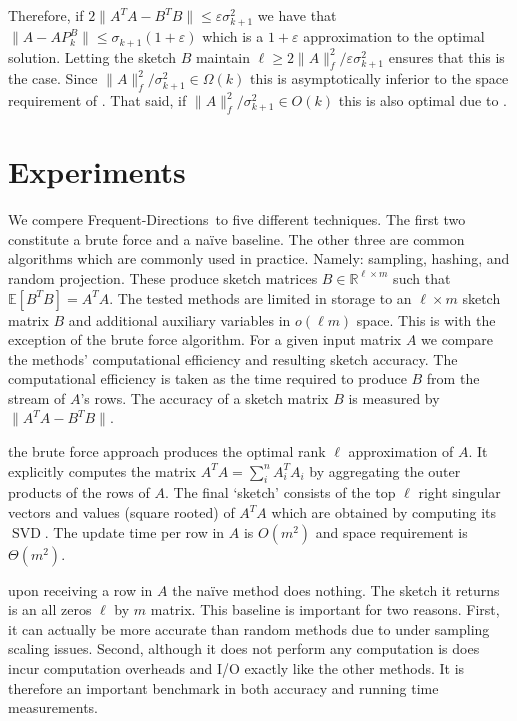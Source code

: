 \documentclass[]{article}
\newcommand{\SVD}{\operatorname{SVD}}
\newcommand{\R}{{\mathbb R}}
\newcommand{\E}{{\mathbb E}}
\newcommand{\eps}{\varepsilon}
\newcommand{\FD}{Frequent-Directions}
\begin{document}
Therefore, if  $2\|A^{T}A - B^{T}B\| \le \eps \sigma^{2}_{k+1}$ we have that $\|A - AP^{B}_{k}\| \le \sigma_{k+1}(1+\eps)$
which is a $1+\eps$ approximation to the optimal solution.
Letting the sketch $B$ maintain $\ell \ge 2\|A\|^{2}_{f}/\eps \sigma^{2}_{k+1}$ ensures that this is the case.
Since $\|A\|_{f}^{2} / \sigma_{k+1}^{2} \in \Omega(k)$ this is asymptotically inferior to the space requirement of \cite{BoutsidisDrineasMagdon2011}. That said, if $\|A\|_{f}^{2}/\sigma_{k+1}^{2} \in O(k)$ this is also optimal due to \cite{ClarksonWoodruff2009}.  


\section{Experiments}\label{experiments}

We compere \FD~to five different techniques. 
The first two constitute a brute force and a na\"ive baseline. 
The other three are common algorithms which are commonly used in practice.
Namely: sampling, hashing, and random projection. 
These produce sketch matrices $B \in \R^{\ell \times m}$ such that $\E[B^{T} B] = A^T A$. 
The tested methods are limited in storage to an $\ell \times m$ sketch matrix $B$ and additional auxiliary variables in $o(\ell  m)$ space.
This is with the exception of the brute force algorithm.
For a given input matrix $A$ we compare the methods' computational efficiency and resulting sketch accuracy.
The computational efficiency is taken as the time required to produce $B$ from the stream of $A$'s rows. 
The accuracy of a sketch matrix $B$ is measured by $\|A^{T}A - B^{T}B\|$.

 the brute force approach produces the optimal rank $\ell$ approximation of $A$.
It explicitly computes the matrix $A^{T}A = \sum_{i}^{n} A_{i}^{T} A_{i}$ by aggregating the outer products of the rows of $A$. 
The final `sketch' consists of the top $\ell$ right singular vectors and 
values (square rooted) of $A^{T}A$ which are obtained by computing its $\SVD$.
The update time per row in $A$ is $O(m^2)$ and space requirement is $\Theta(m^2)$.

 upon receiving a row in $A$ the na\"ive method does nothing. The sketch it returns is an all zeros $\ell$ by $m$ matrix.
This baseline is important for two reasons. 
First, it can actually be more accurate than random methods due to under sampling scaling issues.
Second, although it does not perform any computation is does incur computation overheads and I/O exactly like the other methods.
It is therefore an important benchmark in both accuracy and running time measurements.
\end{document}
